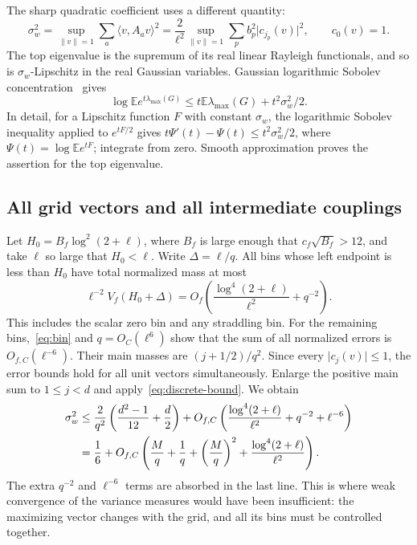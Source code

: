 \documentclass[11pt,reqno]{amsart}
\numberwithin{equation}{section}
\newcommand{\E}{\mathbb E}
\newcommand{\norm}[1]{\lVert#1\rVert}
\newcommand{\abs}[1]{\lvert#1\rvert}
\newcommand{\ip}[2]{\langle#1,#2\rangle}
\begin{document}
The sharp quadratic coefficient uses a different quantity:
\begin{equation}\label{eq:weak-variance}
 \sigma_w^2=\sup_{\norm v=1}\sum_a\ip v{A_av}^2
     =\frac2{\ell^2}\sup_{\norm v=1}
                    \sum_pb_p^2\abs{c_{j_p}(v)}^2,
 \qquad c_0(v)=1.
\end{equation}
The top eigenvalue is the supremum of its real linear Rayleigh
functionals, and so is $\sigma_w$-Lipschitz in the real Gaussian
variables. Gaussian logarithmic Sobolev concentration~\cite{Gross,Ledoux}
gives
\begin{equation}\label{eq:weak-concentration}
 \log\E e^{t\lambda_{\max}(G)}
       \le t\E\lambda_{\max}(G)+t^2\sigma_w^2/2.
\end{equation}
In detail, for a Lipschitz function $F$ with constant $\sigma_w$,
the logarithmic Sobolev inequality applied to $e^{tF/2}$ gives
$t\Psi'(t)-\Psi(t)\le t^2\sigma_w^2/2$, where
$\Psi(t)=\log\E e^{tF}$; integrate from zero. Smooth
approximation proves the assertion for the top eigenvalue.

\subsection*{All grid vectors and all intermediate couplings}

Let $H_0=B_f\log^2(2+\ell)$, where $B_f$ is large enough that
$c_f\sqrt{B_f}>12$, and take $\ell$ so large that $H_0<\ell$.
Write $\Delta=\ell/q$. All bins whose left endpoint is less
than $H_0$ have total normalized mass at most
\begin{equation}\label{eq:short-bin-budget}
 \ell^{-2}V_f(H_0+\Delta)
       =O_f\left(\frac{\log^4(2+\ell)}{\ell^2}+q^{-2}\right).
\end{equation}
This includes the scalar zero bin and any straddling bin.
For the remaining bins,~\eqref{eq:bin} and $q=O_C(\ell^6)$
show that the sum of all normalized errors is $O_{f,C}(\ell^{-6})$.
Their main masses are $(j+1/2)/q^2$.
Since every $\abs{c_j(v)}\le1$, the error bounds hold for all
unit vectors simultaneously. Enlarge the positive main sum to
$1\le j<d$ and apply~\eqref{eq:discrete-bound}. We obtain
\begin{align}\label{eq:uniform-weak-bound}
 \sigma_w^2
 &\le\frac2{q^2}\left(\frac{d^2-1}{12}+\frac d2\right)
      +O_{f,C}\left(\frac{\log^4(2+\ell)}{\ell^2}+q^{-2}
                          +\ell^{-6}\right)\notag\\
 &=\frac16+O_{f,C}\left(\frac Mq+\frac1q+
                \left(\frac Mq\right)^2+
                \frac{\log^4(2+\ell)}{\ell^2}\right).
\end{align}
The extra $q^{-2}$ and $\ell^{-6}$ terms are absorbed in the
last line. This is where weak convergence of the variance measures
would have been insufficient: the maximizing vector changes with
the grid, and all its bins must be controlled together.
\end{document}
